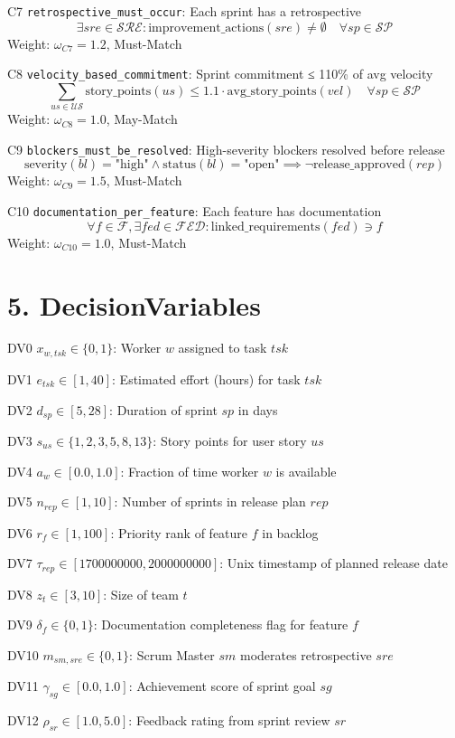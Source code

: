 \documentclass[12pt]{article}
\begin{document}
    \item[C7] \texttt{retrospective\_must\_occur}: Each sprint has a retrospective
    \[
    \exists sre \in \mathcal{SRE}: \text{improvement\_actions}(sre) \neq \emptyset \quad \forall sp \in \mathcal{SP}
    \]
    Weight: $ \omega_{C7} = 1.2 $, Must-Match

    \item[C8] \texttt{velocity\_based\_commitment}: Sprint commitment ≤ 110\% of avg velocity
    \[
    \sum_{us \in \mathcal{US}} \text{story\_points}(us) \leq 1.1 \cdot \text{avg\_story\_points}(vel) \quad \forall sp \in \mathcal{SP}
    \]
    Weight: $ \omega_{C8} = 1.0 $, May-Match

    \item[C9] \texttt{blockers\_must\_be\_resolved}: High-severity blockers resolved before release
    \[
    \text{severity}(bl) = \text{"high"} \land \text{status}(bl) = \text{"open"} \implies \neg \text{release\_approved}(rep)
    \]
    Weight: $ \omega_{C9} = 1.5 $, Must-Match

    \item[C10] \texttt{documentation\_per\_feature}: Each feature has documentation
    \[
    \forall f \in \mathcal{F}, \exists fed \in \mathcal{FED}: \text{linked\_requirements}(fed) \ni f
    \]
    Weight: $ \omega_{C10} = 1.0 $, Must-Match

\section{5. DecisionVariables}
\item[DV0] $ x_{w,tsk} \in \{0,1\} $: Worker $ w $ assigned to task $ tsk $
    \item[DV1] $ e_{tsk} \in [1, 40] $: Estimated effort (hours) for task $ tsk $
    \item[DV2] $ d_{sp} \in [5, 28] $: Duration of sprint $ sp $ in days
    \item[DV3] $ s_{us} \in \{1,2,3,5,8,13\} $: Story points for user story $ us $
    \item[DV4] $ a_w \in [0.0, 1.0] $: Fraction of time worker $ w $ is available
    \item[DV5] $ n_{rep} \in [1, 10] $: Number of sprints in release plan $ rep $
    \item[DV6] $ r_f \in [1, 100] $: Priority rank of feature $ f $ in backlog
    \item[DV7] $ \tau_{rep} \in [1700000000, 2000000000] $: Unix timestamp of planned release date
    \item[DV8] $ z_t \in [3, 10] $: Size of team $ t $
    \item[DV9] $ \delta_f \in \{0,1\} $: Documentation completeness flag for feature $ f $
    \item[DV10] $ m_{sm,sre} \in \{0,1\} $: Scrum Master $ sm $ moderates retrospective $ sre $
    \item[DV11] $ \gamma_{sg} \in [0.0, 1.0] $: Achievement score of sprint goal $ sg $
    \item[DV12] $ \rho_{sr} \in [1.0, 5.0] $: Feedback rating from sprint review $ sr $
\end{document}
